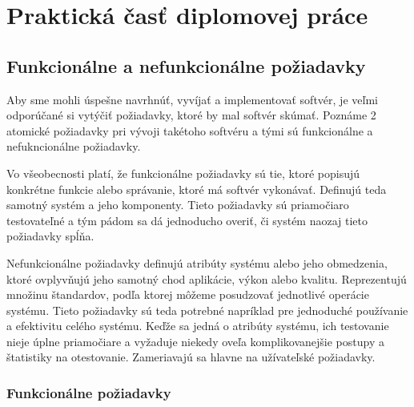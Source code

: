 \section{Praktická časť diplomovej práce}

\subsection{Funkcionálne a nefunkcionálne požiadavky}

Aby sme mohli úspešne navrhnúť, vyvíjať a implementovať softvér, je veľmi odporúčané si vytýčiť požiadavky, ktoré by mal softvér skúmať. Poznáme 2 atomické požiadavky pri vývoji takétoho softvéru a tými sú funkcionálne a nefukncionálne požiadavky. 

Vo všeobecnosti platí, že funkcionálne požiadavky sú tie, ktoré popisujú konkrétne funkcie alebo správanie, ktoré má softvér vykonávať. Definujú teda samotný systém a jeho komponenty. Tieto požiadavky sú priamočiaro testovateľné a tým pádom sa dá jednoducho overiť, či systém naozaj tieto požiadavky spĺňa.

Nefunkcionálne požiadavky definujú atribúty systému alebo jeho obmedzenia, ktoré ovplyvňujú jeho samotný chod aplikácie, výkon alebo kvalitu. Reprezentujú množinu štandardov, podľa ktorej môžeme posudzovať jednotlivé operácie systému. Tieto požiadavky sú teda potrebné napríklad pre jednoduché používanie a efektivitu celého systému. Keďže sa jedná o atribúty systému, ich testovanie nieje úplne priamočiare a vyžaduje niekedy oveľa komplikovanejšie postupy a štatistiky na otestovanie. Zameriavajú sa hlavne na užívateľské požiadavky.

\subsubsection{Funkcionálne požiadavky}

